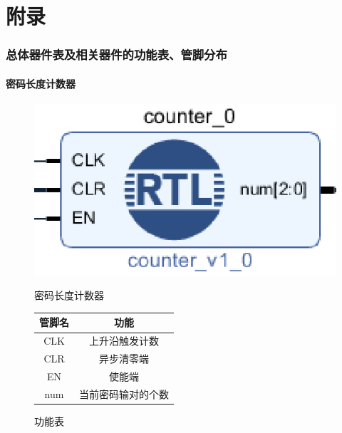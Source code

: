 \documentclass[a4paper,11pt]{ctexart}
\begin{document}
\newpage
\appendix
\part{附录}
\section{总体器件表及相关器件的功能表、管脚分布}
\subsection{密码长度计数器}
\begin{figure}[htb]
  \begin{minipage}[b]{0.5\textwidth}
    \centering
    \includegraphics{./images/counter.eps}
    \caption{密码长度计数器}
    \label{fig:by:table}
  \end{minipage}%
  \begin{minipage}[b]{0.5\textwidth}
    \centering
    \begin{tabular}{|c|c|} \hline
      管脚名 & 功能                                            \\ \hline\hline
      CLK       &   上升沿触发计数      \\
      CLR       & 异步清零端                     \\
      EN        & 使能端                             \\
      num       & 当前密码输对的个数    \\ \hline
    \end{tabular}
    \caption{功能表}
    \label{table:by:fig}
  \end{minipage}
\end{figure}
\end{document}
